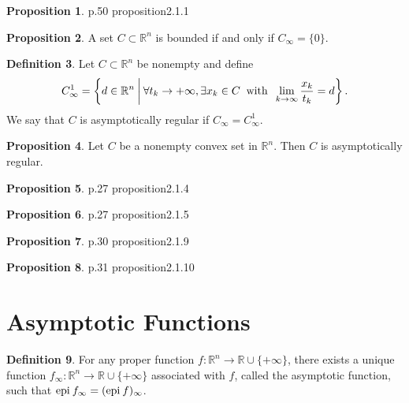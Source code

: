 \documentclass[a4paper,11pt, oneside]{book}
\theoremstyle{definition}
\newtheorem{dfn}{Definition}[section]
\newtheorem{prop}[dfn]{Proposition}
\newcommand{\RealNumberSet}{\mathbb{R}}
\newcommand{\NDemenstionalRealEuclideanSpace}{\mathbb{R}^n}
\newcommand{\Epigraph}[1]{\text{\rm epi\:${#1}$}} %
\newcommand{\ExtendedRealValuedFunction}[2]{{#1}: {#2} \to \RealNumberSet \cup \{+\infty\}}
\begin{document}
\begin{prop}\label{basicPropositionOfAsymptoticCone}
  p.50 proposition2.1.1
\end{prop}

\begin{prop}
  A set $C \subset \mathbb{R}^n$ is bounded if and only if $C_\infty = \{0\}$.
\end{prop}

\begin{dfn}
  Let $C \subset \NDemenstionalRealEuclideanSpace$ be nonempty and define
  \begin{equation}
    C_{\infty}^1 = \left\{d \in \NDemenstionalRealEuclideanSpace \:\middle|\: \forall t_k \rightarrow + \infty , \exists x_k \in C \:\text{ with }\: \lim_{k \to \infty} \frac{x_k}{t_k} = d \right\}. \notag
  \end{equation}
  We say that $C$ is asymptotically regular if $C_{\infty} = C_{\infty}^1$.
\end{dfn}

\begin{prop}
  Let $C$ be a nonempty convex set in $\NDemenstionalRealEuclideanSpace$. Then $C$ is asymptotically regular.
\end{prop}

\begin{prop}
  p.27 proposition2.1.4
\end{prop}

\begin{prop}
  p.27 proposition2.1.5
\end{prop}

\begin{prop}
  p.30 proposition2.1.9
\end{prop}

\begin{prop}
  p.31 proposition2.1.10
\end{prop}

\section{Asymptotic Functions}

\begin{dfn}
  For any proper function $\ExtendedRealValuedFunction{f}{\NDemenstionalRealEuclideanSpace}$, there exists a unique function $\ExtendedRealValuedFunction{f_{\infty}}{\NDemenstionalRealEuclideanSpace}$ associated with $f$, called the asymptotic function, such that $\Epigraph{f_\infty} = (\Epigraph{f})_{\infty}$.
\end{dfn}
\end{document}

